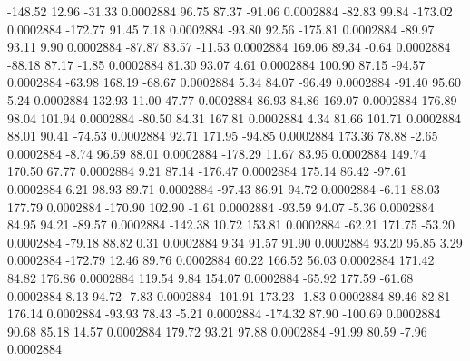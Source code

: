      -148.52       12.96      -31.33     0.0002884
       96.75       87.37      -91.06     0.0002884
      -82.83       99.84     -173.02     0.0002884
     -172.77       91.45        7.18     0.0002884
      -93.80       92.56     -175.81     0.0002884
      -89.97       93.11        9.90     0.0002884
      -87.87       83.57      -11.53     0.0002884
      169.06       89.34       -0.64     0.0002884
      -88.18       87.17       -1.85     0.0002884
       81.30       93.07        4.61     0.0002884
      100.90       87.15      -94.57     0.0002884
      -63.98      168.19      -68.67     0.0002884
        5.34       84.07      -96.49     0.0002884
      -91.40       95.60        5.24     0.0002884
      132.93       11.00       47.77     0.0002884
       86.93       84.86      169.07     0.0002884
      176.89       98.04      101.94     0.0002884
      -80.50       84.31      167.81     0.0002884
        4.34       81.66      101.71     0.0002884
       88.01       90.41      -74.53     0.0002884
       92.71      171.95      -94.85     0.0002884
      173.36       78.88       -2.65     0.0002884
       -8.74       96.59       88.01     0.0002884
     -178.29       11.67       83.95     0.0002884
      149.74      170.50       67.77     0.0002884
        9.21       87.14     -176.47     0.0002884
      175.14       86.42      -97.61     0.0002884
        6.21       98.93       89.71     0.0002884
      -97.43       86.91       94.72     0.0002884
       -6.11       88.03      177.79     0.0002884
     -170.90      102.90       -1.61     0.0002884
      -93.59       94.07       -5.36     0.0002884
       84.95       94.21      -89.57     0.0002884
     -142.38       10.72      153.81     0.0002884
      -62.21      171.75      -53.20     0.0002884
      -79.18       88.82        0.31     0.0002884
        9.34       91.57       91.90     0.0002884
       93.20       95.85        3.29     0.0002884
     -172.79       12.46       89.76     0.0002884
       60.22      166.52       56.03     0.0002884
      171.42       84.82      176.86     0.0002884
      119.54        9.84      154.07     0.0002884
      -65.92      177.59      -61.68     0.0002884
        8.13       94.72       -7.83     0.0002884
     -101.91      173.23       -1.83     0.0002884
       89.46       82.81      176.14     0.0002884
      -93.93       78.43       -5.21     0.0002884
     -174.32       87.90     -100.69     0.0002884
       90.68       85.18       14.57     0.0002884
      179.72       93.21       97.88     0.0002884
      -91.99       80.59       -7.96     0.0002884
